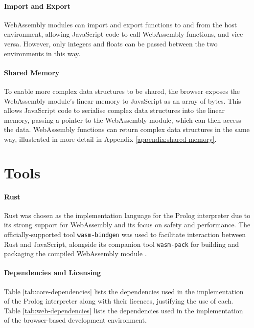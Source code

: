\paragraph{Import and Export} WebAssembly modules can import and export functions to and from the host environment, allowing JavaScript code to call WebAssembly functions, and vice versa. However, only integers and floats can be passed between the two environments in this way.

\paragraph{Shared Memory} To enable more complex data structures to be shared, the browser exposes the WebAssembly module's linear memory to JavaScript as an array of bytes. This allows JavaScript code to serialise complex data structures into the linear memory, passing a pointer to the WebAssembly module, which can then access the data. WebAssembly functions can return complex data structures in the same way, illustrated in more detail in Appendix \ref{appendix:shared-memory}.

\section{Tools}

\label{sec:tools}

\paragraph{Rust}

Rust was chosen as the implementation language for the Prolog interpreter due to its strong support for WebAssembly and its focus on safety and performance. The officially-supported tool \texttt{wasm-bindgen} was used to facilitate interaction between Rust and JavaScript, alongside its companion tool \texttt{wasm-pack} for building and packaging the compiled WebAssembly module \cite{crichtonwasmbindgenhttpsgithubcom2014}.

\paragraph{Dependencies and Licensing}

Table \ref{tab:core-dependencies} lists the dependencies used in the implementation of the Prolog interpreter along with their licences, justifying the use of each. Table \ref{tab:web-dependencies} lists the dependencies used in the implementation of the browser-based development environment.

